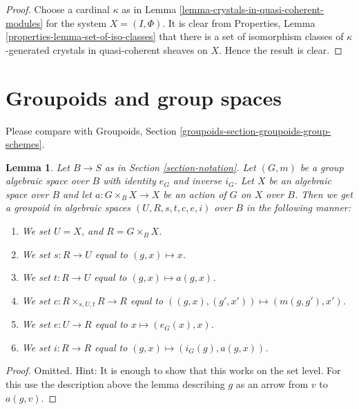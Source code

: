 \documentclass{stacks-project}
\theoremstyle{plain}
\newtheorem{lemma}[subsection]{Lemma}
\theoremstyle{definition}
\theoremstyle{remark}
\numberwithin{equation}{subsection}
\begin{document}
\begin{proof}
\medskip\noindent
Choose a cardinal $\kappa$ as in
Lemma \ref{lemma-crystals-in-quasi-coherent-modules}
for the system $X = (I, \Phi)$. It is clear from
Properties, Lemma \ref{properties-lemma-set-of-iso-classes}
that there is a set of isomorphism classes of $\kappa$-generated
crystals in quasi-coherent sheaves on $X$.
Hence the result is clear.
\end{proof}









\section{Groupoids and group spaces}
\label{section-groupoids-group-spaces}

\noindent
Please compare with
Groupoids, Section \ref{groupoids-section-groupoids-group-schemes}.

\begin{lemma}
\label{lemma-groupoid-from-action}
Let $B \to S$ as in Section \ref{section-notation}.
Let $(G, m)$ be a group algebraic space over $B$ with
identity $e_G$ and inverse $i_G$.
Let $X$ be an algebraic space over $B$ and let $a : G \times_B X \to X$
be an action of $G$ on $X$ over $B$.
Then we get a groupoid in algebraic spaces $(U, R, s, t, c, e, i)$ over $B$
in the following manner:
\begin{enumerate}
\item We set $U = X$, and $R = G \times_B X$.
\item We set $s : R \to U$ equal to $(g, x) \mapsto x$.
\item We set $t : R \to U$ equal to $(g, x) \mapsto a(g, x)$.
\item We set $c : R \times_{s, U, t} R \to R$ equal to
$((g, x), (g', x')) \mapsto (m(g, g'), x')$.
\item We set $e : U \to R$ equal to $x \mapsto (e_G(x), x)$.
\item We set $i : R \to R$ equal to $(g, x) \mapsto (i_G(g), a(g, x))$.
\end{enumerate}
\end{lemma}

\begin{proof}
Omitted. Hint: It is enough to show that this works on the set
level. For this use the description above the lemma describing
$g$ as an arrow from $v$ to $a(g, v)$.
\end{proof}
\end{document}
